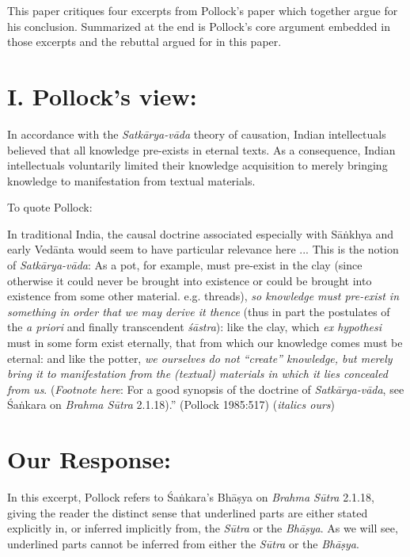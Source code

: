 This paper critiques four excerpts from Pollock's paper which together argue for his conclusion. Summarized at the end is Pollock's core argument embedded in those excerpts and the rebuttal argued for in this paper.

\section*{I. Pollock's view:}  

In accordance with the {\sl Satkārya-vāda} theory of causation, Indian intellectuals believed that all knowledge pre-exists in eternal texts. As a consequence, Indian intellectuals voluntarily limited their knowledge acquisition to merely bringing knowledge to manifestation from textual materials.

\newpage

To quote Pollock:
\begin{myquote}
In traditional India, the causal doctrine associated especially with Sāṅkhya and early Vedānta would seem to have particular relevance here ... This is the notion of {\sl Satkārya-vāda}: As a pot, for example, must pre-exist in the clay (since otherwise it could never be brought into existence or could be brought into existence from some other material. e.g.  threads), {\sl so knowledge must pre-exist in something in order that we may derive it thence} (thus in part the postulates of the {\sl a priori} and finally transcendent {\sl śāstra}): like the clay, which {\sl ex hypothesi} must in some form exist eternally, that from which our knowledge comes must be eternal: and like the potter, {\sl we ourselves do not ``create'' knowledge, but merely bring it to manifestation from the (textual) materials in which it lies concealed from us}. ({\sl Footnote here}: For a good synopsis of the doctrine of {\sl Satkārya-vāda}, see Śaṅkara on {\sl Brahma Sūtra} 2.1.18).''  
\hfill (Pollock 1985:517) ({\sl italics ours})
\end{myquote}

\section*{Our Response:}

In this excerpt, Pollock refers to Śaṅkara's Bhāṣya on {\sl Brahma Sūtra} 2.1.18, giving the reader the distinct sense that underlined parts are either stated explicitly in, or inferred implicitly from, the {\sl Sūtra} or the {\sl Bhāṣya}.  As we will see, underlined parts cannot be inferred from either the {\sl Sūtra} or the {\sl Bhāṣya}.


